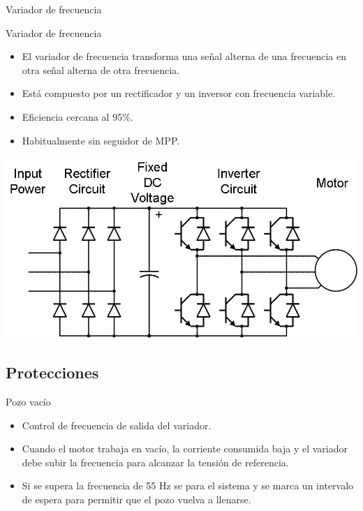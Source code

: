 \documentclass[xcolor={usenames,svgnames,dvipsnames}]{beamer}
\begin{document}
\begin{frame}[label={sec:org4528af7}]{Variador de frecuencia}
\end{frame}
\begin{frame}[label={sec:org11c7b11}]{Variador de frecuencia}
\begin{itemize}
\item El variador de frecuencia \alert{transforma una señal alterna de una frecuencia en otra señal alterna de otra frecuencia}.

\item Está compuesto por un rectificador y un inversor con frecuencia variable.

\item Eficiencia cercana al 95\%.

\item Habitualmente sin seguidor de MPP.
\end{itemize}

\begin{center}
\includegraphics[width=.9\linewidth]{../figs/VariadorFrecuencia_esquema.png}
\end{center}
\end{frame}


\subsection{Protecciones}
\label{sec:org7ea4167}

\begin{frame}[label={sec:org877300d}]{Pozo vacío}
\begin{itemize}
\item \alert{Control de frecuencia de salida del variador}.

\item Cuando el motor trabaja en vacío, la corriente consumida baja y el variador debe subir la frecuencia para alcanzar la tensión de referencia.

\item Si se supera la frecuencia de 55 Hz se para el sistema y se marca un intervalo de espera para permitir que el pozo vuelva a llenarse.
\end{itemize}
\end{frame}
\end{document}
